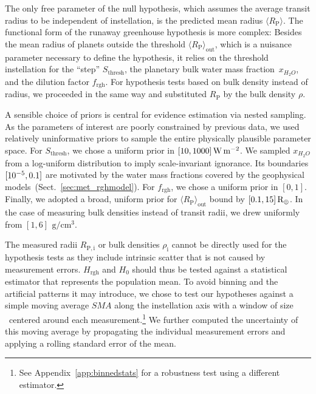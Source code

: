 \documentclass[twocolumn,twocolappendix]{aastex631}
\begin{document}
The only free parameter of the null hypothesis, which assumes the average transit radius to be independent of instellation, is the predicted mean radius $\langle R_\mathrm{P}\rangle $.
The functional form of the runaway greenhouse hypothesis is more complex: Besides the mean radius of planets outside the threshold $\langle R_\mathrm{P}\rangle_\mathrm{out}$, which is a nuisance parameter necessary to define the hypothesis, it relies on the threshold instellation for the ``step'' $S_\mathrm{thresh}$, the planetary bulk water mass fraction~$x_{H_2O}$, and the dilution factor $f_\mathrm{rgh}$.
For hypothesis tests based on bulk density instead of radius, we proceeded in the same way and substituted $R_\mathrm{P}$ by the bulk density $\rho$.

A sensible choice of priors is central for evidence estimation via nested sampling.
As the parameters of interest are poorly constrained by previous data, we used relatively uninformative priors to sample the entire physically plausible parameter space.
For $S_\mathrm{thresh}$, we chose a uniform prior in $[10,1000]\, \SI{}{\watt\per\meter\squared}$.
We sampled $x_{H_2O}$ from a log-uniform distribution to imply scale-invariant ignorance.
Its boundaries $[10^{-5}, 0.1]$ are motivated by the water mass fractions covered by the geophysical models~(Sect.~\ref{sec:met_rghmodel}).
For $f_\mathrm{rgh}$, we chose a uniform prior in $[0, 1]$.
Finally, we adopted a broad, uniform prior for $\langle R_\mathrm{P}\rangle_\mathrm{out}$ bound by $[0.1, 15] \, \mathrm{R_\oplus}$.
In the case of measuring bulk densities instead of transit radii, we drew uniformly from $[1, 6] \, \SI{}{\gram\per\centi\meter\cubed}$.

The measured radii $R_\mathrm{P, i}$ or bulk densities $\rho_\mathrm{i}$ cannot be directly used for the hypothesis tests as they include intrinsic scatter that is not caused by measurement errors.
$H_{\mathrm{rgh}}$ and $H_0$ should thus be tested against a statistical estimator that represents the population mean.
To avoid binning and the artificial patterns it may introduce, we chose to test our hypotheses against a simple moving average $SMA$ along the instellation axis with a window of size \windowsize\ centered around each measurement.\footnote{See Appendix~\ref{app:binnedstats} for a robustness test using a different estimator.}
We further computed the uncertainty of this moving average by propagating the individual measurement errors and applying a rolling standard error of the mean. %
\end{document}
